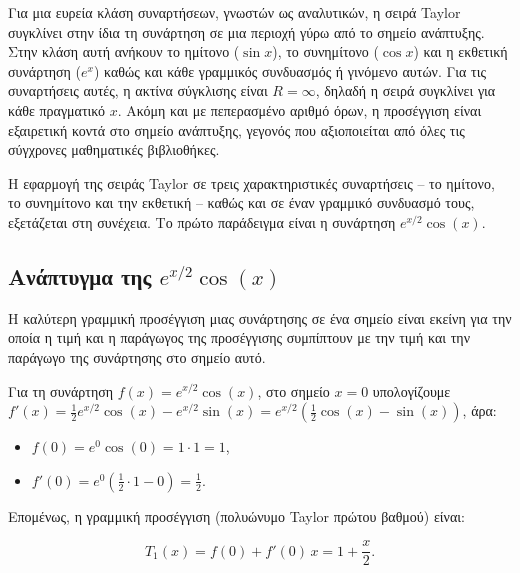 Για μια ευρεία κλάση συναρτήσεων, γνωστών ως αναλυτικών, η σειρά Taylor
συγκλίνει στην ίδια τη συνάρτηση σε μια περιοχή γύρω από το σημείο
ανάπτυξης. Στην κλάση αυτή ανήκουν το ημίτονο (\(\sin x\)), το
συνημίτονο (\(\cos x\)) και η εκθετική συνάρτηση (\(e^x\)) καθώς και
κάθε γραμμικός συνδυασμός ή γινόμενο αυτών. Για τις συναρτήσεις αυτές, η
ακτίνα σύγκλισης είναι \(R = \infty\), δηλαδή η σειρά συγκλίνει για κάθε
πραγματικό \(x\). Ακόμη και με πεπερασμένο αριθμό όρων, η προσέγγιση
είναι εξαιρετική κοντά στο σημείο ανάπτυξης, γεγονός που αξιοποιείται
από όλες τις σύγχρονες μαθηματικές βιβλιοθήκες.

Η εφαρμογή της σειράς Taylor σε τρεις χαρακτηριστικές συναρτήσεις -- το
ημίτονο, το συνημίτονο και την εκθετική -- καθώς και σε έναν γραμμικό
συνδυασμό τους, εξετάζεται στη συνέχεια. Το πρώτο παράδειγμα είναι η
συνάρτηση \(e^{x/2}\cos(x)\).

\subsection{\texorpdfstring{Ανάπτυγμα της
\(e^{x/2}\cos(x)\)}{Ανάπτυγμα της e\^{}\{x/2\}\textbackslash cos(x)}}\label{ux3b1ux3bdux3acux3c0ux3c4ux3c5ux3b3ux3bcux3b1-ux3c4ux3b7ux3c2-ex2cosx}

Η καλύτερη γραμμική προσέγγιση μιας συνάρτησης σε ένα σημείο είναι
εκείνη για την οποία η τιμή και η παράγωγος της προσέγγισης συμπίπτουν
με την τιμή και την παράγωγο της συνάρτησης στο σημείο αυτό.

Για τη συνάρτηση \(f(x) = e^{x/2} \cos(x)\), στο σημείο \(x = 0\)
υπολογίζουμε
\(f'(x) = \frac{1}{2} e^{x/2} \cos(x) - e^{x/2} \sin(x) = e^{x/2} \left( \frac{1}{2} \cos(x) - \sin(x) \right)\),
άρα:

\begin{itemize}
\tightlist
\item
  \(f(0) = e^{0} \cos(0) = 1 \cdot 1 = 1\),\\
\item
  \(f'(0) = e^{0} \left( \frac{1}{2} \cdot 1 - 0 \right) = \frac{1}{2}\).
\end{itemize}

Επομένως, η γραμμική προσέγγιση (πολυώνυμο Taylor πρώτου βαθμού) είναι:

\[
\boxed{T_1(x) = f(0) + f'(0) \, x = 1 + \frac{x}{2}}.
\]

